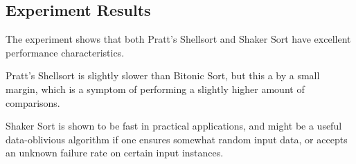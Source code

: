\subsection{Experiment Results}

The experiment shows that both Pratt's Shellsort and Shaker Sort have excellent performance characteristics.

Pratt's Shellsort is slightly slower than Bitonic Sort, but this a by a small margin, which is a symptom of performing a slightly higher amount of comparisons.

Shaker Sort is shown to be fast in practical applications, and might be a useful data-oblivious algorithm if one ensures somewhat random input data, or accepts an unknown failure rate on certain input instances.